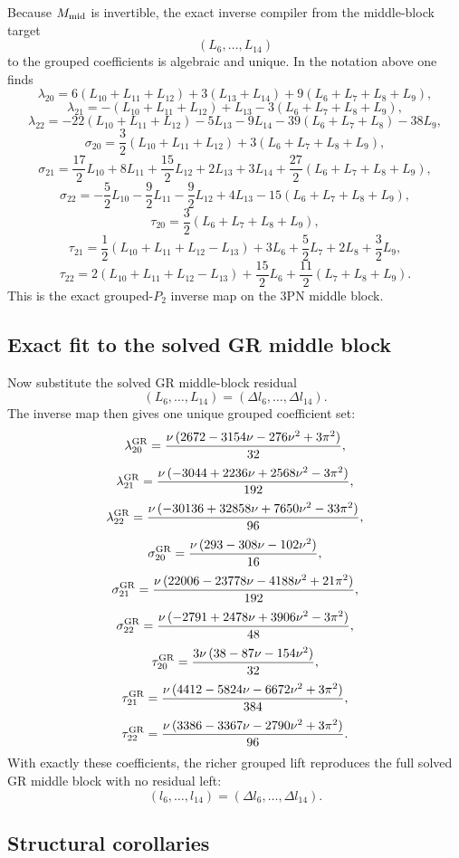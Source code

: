 \documentclass[11pt]{article}
\begin{document}
Because $M_{\rm mid}$ is invertible, the exact inverse compiler from the middle-block target
\[
(L_6,\dots,L_{14})
\]
to the grouped coefficients is algebraic and unique. In the notation above one finds
\[
\boxed{
\lambda_{20}
=
6(L_{10}+L_{11}+L_{12})
+3(L_{13}+L_{14})
+9(L_6+L_7+L_8+L_9),
}
\]
\[
\boxed{
\lambda_{21}
=
-(L_{10}+L_{11}+L_{12})
+L_{13}
-3(L_6+L_7+L_8+L_9),
}
\]
\[
\boxed{
\lambda_{22}
=
-22(L_{10}+L_{11}+L_{12})
-5L_{13}-9L_{14}
-39(L_6+L_7+L_8)-38L_9,
}
\]
\[
\boxed{
\sigma_{20}
=
\frac32(L_{10}+L_{11}+L_{12})
+3(L_6+L_7+L_8+L_9),
}
\]
\[
\boxed{
\sigma_{21}
=
\frac{17}{2}L_{10}+8L_{11}+\frac{15}{2}L_{12}
+2L_{13}+3L_{14}
+\frac{27}{2}(L_6+L_7+L_8+L_9),
}
\]
\[
\boxed{
\sigma_{22}
=
-\frac52L_{10}-\frac92L_{11}-\frac92L_{12}
+4L_{13}-15(L_6+L_7+L_8+L_9),
}
\]
\[
\boxed{
\tau_{20}
=
\frac32(L_6+L_7+L_8+L_9),
}
\]
\[
\boxed{
\tau_{21}
=
\frac12(L_{10}+L_{11}+L_{12}-L_{13})
+3L_6+\frac52L_7+2L_8+\frac32L_9,
}
\]
\[
\boxed{
\tau_{22}
=
2(L_{10}+L_{11}+L_{12}-L_{13})
+\frac{15}{2}L_6+\frac{11}{2}(L_7+L_8+L_9).
}
\]
This is the exact grouped-$P_2$ inverse map on the $3$PN middle block.

\subsection{Exact fit to the solved GR middle block}
\label{app:richer_grouped_p2_compiler_inverse_map:gr_fit}

Now substitute the solved GR middle-block residual
\[
(L_6,\dots,L_{14})=(\Delta l_6,\dots,\Delta l_{14}).
\]
The inverse map then gives one unique grouped coefficient set:
\[
\lambda_{20}^{\rm GR}
=
\frac{\nu\,(2672-3154\nu-276\nu^2+3\pi^2)}{32},
\]
\[
\lambda_{21}^{\rm GR}
=
\frac{\nu\,(-3044+2236\nu+2568\nu^2-3\pi^2)}{192},
\]
\[
\lambda_{22}^{\rm GR}
=
\frac{\nu\,(-30136+32858\nu+7650\nu^2-33\pi^2)}{96},
\]
\[
\sigma_{20}^{\rm GR}
=
\frac{\nu\,(293-308\nu-102\nu^2)}{16},
\]
\[
\sigma_{21}^{\rm GR}
=
\frac{\nu\,(22006-23778\nu-4188\nu^2+21\pi^2)}{192},
\]
\[
\sigma_{22}^{\rm GR}
=
\frac{\nu\,(-2791+2478\nu+3906\nu^2-3\pi^2)}{48},
\]
\[
\tau_{20}^{\rm GR}
=
\frac{3\nu\,(38-87\nu-154\nu^2)}{32},
\]
\[
\tau_{21}^{\rm GR}
=
\frac{\nu\,(4412-5824\nu-6672\nu^2+3\pi^2)}{384},
\]
\[
\tau_{22}^{\rm GR}
=
\frac{\nu\,(3386-3367\nu-2790\nu^2+3\pi^2)}{96}.
\]
With exactly these coefficients, the richer grouped lift reproduces the full solved GR middle block with no residual left:
\[
(l_6,\dots,l_{14})=(\Delta l_6,\dots,\Delta l_{14}).
\]

\subsection{Structural corollaries}
\label{app:richer_grouped_p2_compiler_inverse_map:corollaries}
\end{document}
